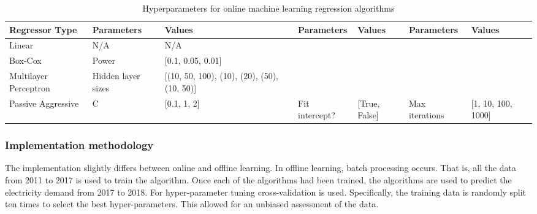 \documentclass[final,3p,times,twocolumn,numbers]{elsarticle}
\begin{document}
\begin{table}
\centering
\begin{tabular}{@{}llp{3cm}lllp{1.6cm}@{}}
\toprule
\textbf{Regressor Type} & \textbf{Parameters} & \textbf{Values}                                  & \textbf{Parameters} & \textbf{Values}   & \textbf{Parameters} & \textbf{Values}        \\ \midrule
Linear                  & N/A                 & N/A                                              &                     &                   &                     &                        \\
Box-Cox                 & Power               & {[}0.1, 0.05, 0.01{]}                            &                     &                   &                     &                        \\
Multilayer Perceptron   & Hidden layer sizes  & {[}(10, 50, 100), (10),  (20), (50), (10, 50){]} & 
                    &                   &                     &                        \\ 
                    Passive Aggressive      & C                   & {[}0.1, 1, 2{]}                                  & Fit intercept?      & {[}True, False{]} & Max iterations      & {[}1, 10, 100, 1000{]} \\
\bottomrule
\end{tabular}%
\caption{Hyperparameters for online machine learning regression algorithms}
\label{table:hyperparameter-tuning-online}
\end{table}%

\subsubsection{Implementation methodology}

The implementation slightly differs between online and offline learning. In offline learning, batch processing occurs. That is, all the data from 2011 to 2017 is used to train the algorithm. Once each of the algorithms had been trained, the algorithms are used to predict the electricity demand from 2017 to 2018. For hyper-parameter tuning cross-validation is used. Specifically, the training data is randomly split ten times to select the best hyper-parameters. This allowed for an unbiased assessment of the data.  
\end{document}
